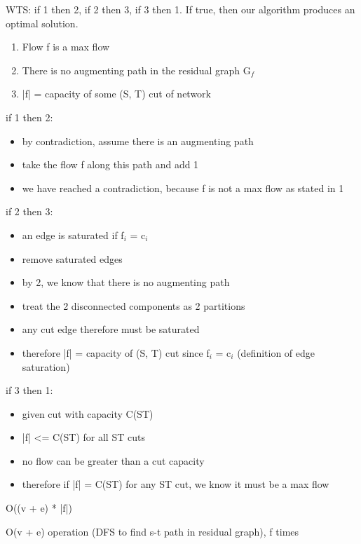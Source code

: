 {
    \item WTS: if 1 then 2, if 2 then 3, if 3 then 1. If true, then our algorithm produces an optimal solution.
    \begin{enumerate}
        \item Flow f is a max flow
        \item There is no augmenting path in the residual graph G$_f$
        \item |f| = capacity of some (S, T) cut of network
    \end{enumerate}
    \item if 1 then 2:
    \begin{itemize}
        \item by contradiction, assume there is an augmenting path 
        \item take the flow f along this path and add 1
        \item we have reached a contradiction, because f is not a max flow as stated in 1
    \end{itemize}
    \item if 2 then 3:
    \begin{itemize}
        \item an edge is saturated if f$_i$ = c$_i$
        \item remove saturated edges
        \item by 2, we know that there is no augmenting path 
        \item treat the 2 disconnected components as 2 partitions
        \item any cut edge therefore must be saturated 
        \item therefore |f| = capacity of (S, T) cut since f$_i$ = c$_i$ (definition of edge saturation)
    \end{itemize}
    \item if 3 then 1:
    \begin{itemize}
        \item given cut with capacity C(ST)
        \item |f| <= C(ST) for all ST cuts
        \item no flow can be greater than a cut capacity
        \item therefore if |f| = C(ST) for any ST cut, we know it must be a max flow
        
    \end{itemize}
}
{
    \item O((v + e) * |f|) 
    \item O(v + e) operation (DFS to find s-t path in residual graph), f times
    
}


